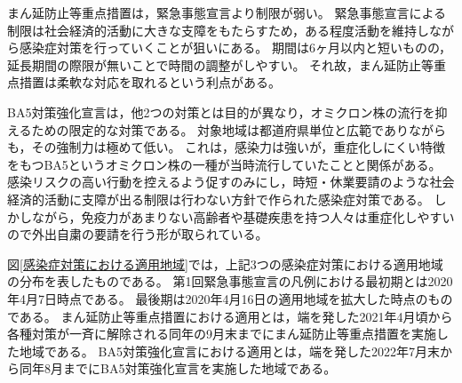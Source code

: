 \documentclass[paper={210mm,297mm},fontsize=15Q,line_length=35zw,number_of_lines=31,head_space=30mm,gutter=40mm,baselineskip=2.0zw,headfoot_verticalposition=1.5zw]{jlreq}
\begin{document}
まん延防止等重点措置は，緊急事態宣言より制限が弱い。
緊急事態宣言による制限は社会経済的活動に大きな支障をもたらすため，ある程度活動を維持しながら感染症対策を行っていくことが狙いにある。
期間は6ヶ月以内と短いものの，延長期間の際限が無いことで時間の調整がしやすい。
それ故，まん延防止等重点措置は柔軟な対応を取れるという利点がある。

BA5対策強化宣言は，他2つの対策とは目的が異なり，オミクロン株の流行を抑えるための限定的な対策である。
対象地域は都道府県単位と広範でありながらも，その強制力は極めて低い。
これは，感染力は強いが，重症化しにくい特徴をもつBA5というオミクロン株の一種が当時流行していたことと関係がある。
感染リスクの高い行動を控えるよう促すのみにし，時短・休業要請のような社会経済的活動に支障が出る制限は行わない方針で作られた感染症対策である。
しかしながら，免疫力があまりない高齢者や基礎疾患を持つ人々は重症化しやすいので外出自粛の要請を行う形が取られている。

図\ref{感染症対策における適用地域}では，上記3つの感染症対策における適用地域の分布を表したものである。
第1回緊急事態宣言の凡例における最初期とは2020年4月7日時点である。
最後期は2020年4月16日の適用地域を拡大した時点のものである。
まん延防止等重点措置における適用とは，端を発した2021年4月頃から各種対策が一斉に解除される同年の9月末までにまん延防止等重点措置を実施した地域である。
BA5対策強化宣言における適用とは，端を発した2022年7月末から同年8月までにBA5対策強化宣言を実施した地域である。
\end{document}
